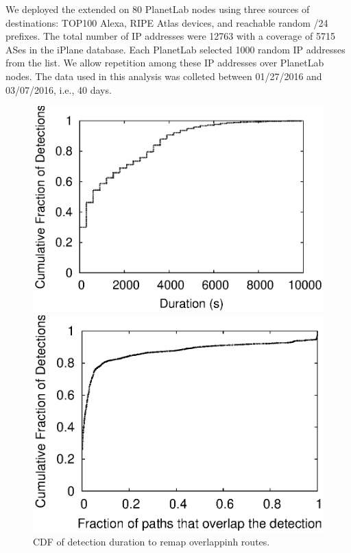 We deployed the extended \dtrack{} on 80 PlanetLab nodes using three 
sources of destinations: TOP100 Alexa,  RIPE Atlas devices, and reachable random
/24 prefixes. The total number of IP addresses were 12763 with a coverage of 5715 ASes 
in the iPlane database. Each PlanetLab selected 1000 random IP addresses from the
list. We allow repetition among these IP addresses over PlanetLab nodes. The data used in 
this analysis was colleted between 01/27/2016 and 03/07/2016, i.e., 40 days.

\begin{figure}
\vspace{5mm}
\begin{minipage}{0.32\textwidth}
\includegraphics[width=1.05\columnwidth]{figs/patching/durationdetection/durationdetection.eps}
\caption{CDF of detection duration to remap overlappinh routes. }
\label{fig:overlap.delay.cdf}
%
\end{minipage}
\hfill
\begin{minipage}{0.32\textwidth}
\includegraphics[width=1.05\columnwidth]{figs/patching/routesoverlapping/routesoverlapping.eps}

\end{minipage}
\end{figure}
